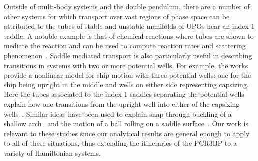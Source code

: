 \documentclass[11pt]{article}
\numberwithin{equation}{section}
\theoremstyle{plain}
\begin{document}
Outside of multi-body systems and the double pendulum, there are a number of other systems for which transport over vast regions of phase space can be attributed to the tubes of stable and unstable manifolds of UPOs near an index-1 saddle. A notable example is that of chemical reactions where tubes are shown to mediate the reaction and can be used to compute reaction rates and scattering phenomenon~\cite{Chemical,Chemical2,Chemical3}. Saddle mediated transport is also particularly useful in describing transitions in systems with two or more potential wells. For example, the works~\cite{Ship1,Ship2} provide a nonlinear model for ship motion with three potential wells: one for the ship being upright in the middle and wells on either side representing capsizing. Here the tubes associated to the index-1 saddles separating the potential wells explain how one transitions from the upright well into either of the capsizing wells~\cite{Naik}. Similar ideas have been used to explain snap-through buckling of a shallow arch~\cite{Arch} and the motion of a ball rolling on a saddle surface~\cite{Ball}. Our work is relevant to these studies since our analytical results are general enough to apply to all of these situations, thus extending the itineraries of the PCR3BP to a variety of Hamiltonian systems. 
 

\end{document}
